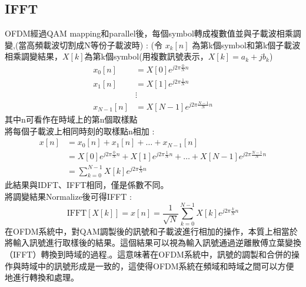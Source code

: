 \documentclass[12pt,a4paper]{article} %
\begin{document}
\subsection{IFFT}
OFDM經過QAM mapping和parallel後，每個symbol轉成複數值並與子載波相乘調變\cite{goldsmith2005wireless},\cite{OFDM正交分頻多工系統1}(當高頻載波切割成N等份子載波時) :
(令 $x_k[n]$ 為第k個symbol和第k個子載波相乘調變結果，$X[k]$為第k個symbol(用複數訊號表示，$X[k] = a_k + jb_k$)
\begin{align*}
x_0[n] &= X[0] e^{j2\pi \frac{0}{N} n} \\
x_1[n] &= X[1] e^{j2\pi \frac{1}{N} n} \\
&\vdots \\
x_{N-1}[n] &= X[N-1] e^{j2\pi \frac{N-1}{N} n}
\end{align*}
其中n可看作在時域上的第n個取樣點\\
將每個子載波上相同時刻的取樣點n相加 :
\begin{align*}
x[n] &= x_0[n] + x_1[n] + \dots + x_{N-1}[n] \\
&= X[0] e^{j2\pi \frac{0}{N} n} + X[1] e^{j2\pi \frac{1}{N} n} + \dots + X[N-1] e^{j2\pi \frac{N-1}{N} n} \\
&= \sum_{k=0}^{N-1} X[k] e^{j2\pi \frac{k}{N} n}
\end{align*}
此結果與IDFT、IFFT相同，僅是係數不同。\\
將調變結果Normalize後可得IFFT :
\[\text{IFFT}[X[k]] = x[n] = \frac{1}{\sqrt{N}} \sum_{k=0}^{N-1} X[k] e^{j2\pi \frac{k}{N} n}\]
在OFDM系統中，對QAM調製後的訊號和子載波進行相加的操作，本質上相當於將輸入訊號進行取樣後的結果。這個結果可以視為輸入訊號通過逆離散傅立葉變換（IFFT）轉換到時域的過程\cite{goldsmith2005wireless},\cite{OFDM正交分頻多工系統1}。這意味著在OFDM系統中，訊號的調製和合併的操作與時域中的訊號形成是一致的，這使得OFDM系統在頻域和時域之間可以方便地進行轉換和處理。
\newpage
\end{document}
